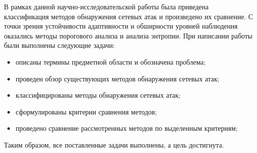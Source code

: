 \conclusion

В рамках данной научно-исследовательской работы была приведена классификация методов обнаружения сетевых атак и произведено их сравнение. С точки зрения устойчивости адаптивности и обширности уровней наблюдения оказались методы порогового анализа и анализа энтропии. 
При написании работы были выполнены следующие задачи:

\begin{itemize}
	\item описаны термины предметной области и обозначена проблема;
	\item проведен обзор существующих методов обнаружения сетевых атак;
	\item классифицированы методы обнаружения сетевых атак;
	\item сформулированы критерии сравнения методов;
	\item проведено сравнение рассмотренных методов по выделенным критериям;
\end{itemize}

Таким образом, все поставленные задачи выполнены, а цель достигнута.
